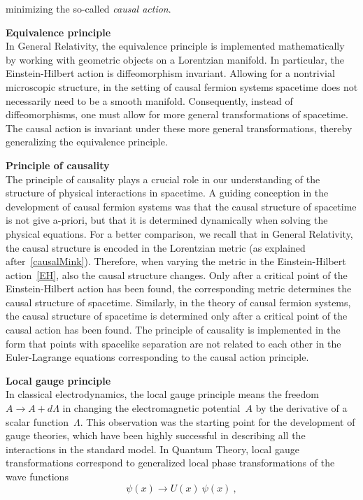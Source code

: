 \documentclass[reqno,11pt]{amsart}
\numberwithin{equation}{section}
\newcommand{\1}{\mbox{\rm 1 \hspace{-1.05 em} 1}}
\newcommand{\itemD}{\item[{\raisebox{0.125em}{\tiny $\blacktriangleright$}}]}
\begin{document}
minimizing the so-called \textit{causal action}. %
\itemD \textbf{Equivalence principle} \\
In General Relativity, the equivalence principle is implemented
mathematically by working with geometric objects on a Lorentzian manifold.
In particular, the Einstein-Hilbert action is diffeomorphism invariant.
Allowing for a nontrivial microscopic structure, in the setting of causal fermion systems
spacetime does not necessarily need to be a smooth manifold.
Consequently, instead of diffeomorphisms, one must allow for more general
transformations of spacetime. The causal action is invariant under these more
general transformations, thereby generalizing the equivalence principle.
\itemD \textbf{Principle of causality} \\
The principle of causality plays a crucial role in our understanding of the structure of
physical interactions in spacetime. A guiding conception in the development of causal
fermion systems was that the causal structure of spacetime is not give a-priori, but that it is
determined dynamically when solving the physical equations.
For a better comparison, we recall that in General Relativity, the causal structure is
encoded in the Lorentzian metric (as explained after~\eqref{causalMink}).
Therefore, when varying the metric in the Einstein-Hilbert action~\eqref{EH}, also the causal structure
changes. Only after a critical point of the Einstein-Hilbert action has been found,
the corresponding metric determines the causal structure of spacetime.
Similarly, in the theory of causal fermion systems, the causal structure of spacetime is
determined only after a critical point of the causal action has been found.
The principle of causality is implemented
in the form that points with spacelike separation are not related to each other in the
Euler-Lagrange equations corresponding to the causal action principle.
\itemD \textbf{Local gauge principle} \\
In classical electrodynamics, the local gauge principle
means the freedom~$A \rightarrow A + d\Lambda$ in changing the electromagnetic
potential~$A$ by the derivative of a scalar function~$\Lambda$.
This observation was the starting point for the development of gauge theories,
which have been highly successful in describing all the interactions in the
standard model. In Quantum Theory, local gauge transformations correspond to
generalized local phase transformations of the wave functions
\[ \psi(x) \rightarrow U(x)\: \psi(x) \:, \]
\end{document}

